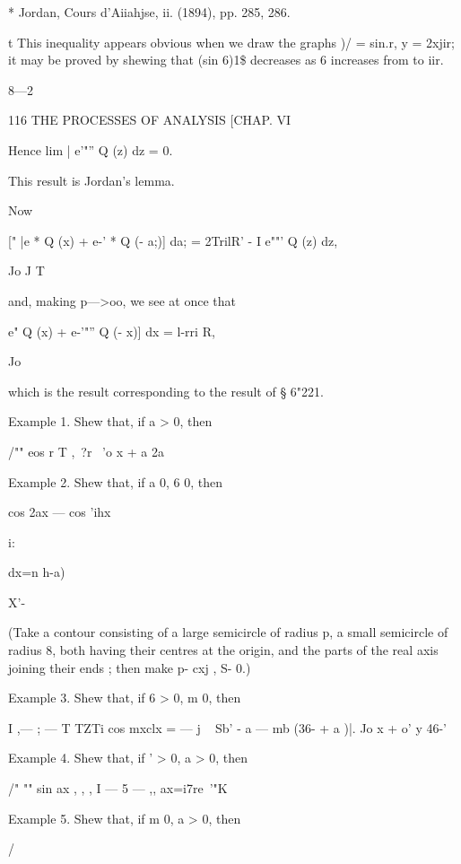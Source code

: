 {* Jordan, Cours d'Aiiahjse, ii. (1894), pp. 285, 286.

t This inequality appears obvious when we draw the graphs )/ = sin.r,
y = 2xjir; it may be proved by shewing that (sin 6)1\$ decreases as 6
increases from to iir.

8—2



116 THE PROCESSES OF ANALYSIS [CHAP. VI



Hence lim | e'"'' Q (z) dz = 0.



This result is Jordan's lemma.

Now

[" |e * Q (x) + e-' * Q (- a;)] da; = 2TrilR' - I e""' Q (z) dz,

Jo J T

and, making p—>oo, we see at once that

 e" Q (x) + e-'"'' Q (- x)] dx = l-rri R,

Jo

which is the result corresponding to the result of § 6"221.

Example 1. Shew that, if a > 0, then

/"" eos r T ,\ ?r \ 'o x + a 2a





Example 2. Shew that, if a 0, 6 0, then

cos 2ax — cos 'ihx



i:



dx=n h-a)



X'-

(Take a contour consisting of a large semicircle of radius p, a small
semicircle of radius 8, both having their centres at the origin, and
the parts of the real axis joining their ends ; then make p- cxj , S-
0.)

Example 3. Shew that, if 6 > 0, m 0, then

I ,— ; — T TZTi cos mxclx = — j ~ Sb' - a — mb (36- + a )|. Jo x + o'
y 46-'

Example 4. Shew that, if ' > 0, a > 0, then

/" "" sin ax , , , I — 5 — ,, ax=i7re~'"K

Example 5. Shew that, if m 0, a > 0, then



/



}

